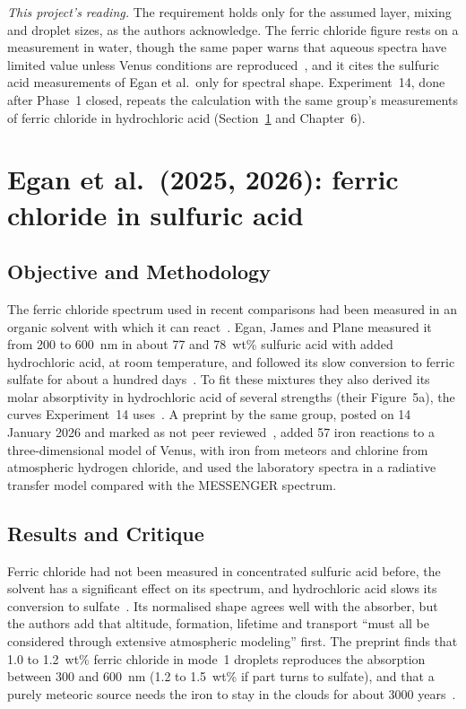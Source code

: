 \emph{This project's reading.} The requirement holds only for the assumed layer, mixing
and droplet sizes, as the authors acknowledge. The ferric chloride figure rests on a
measurement in water, though the same paper warns that aqueous spectra have limited value
unless Venus conditions are reproduced~\cite{spacek2026}, and it cites the sulfuric acid
measurements of Egan et al.\ only for spectral shape. Experiment~14, done after Phase~1
closed, repeats the calculation with the same group's measurements of ferric chloride in
hydrochloric acid (Section~\ref{sec:lit-egan} and Chapter~6).

\section{Egan et al.\ (2025, 2026): ferric chloride in sulfuric acid}
\label{sec:lit-egan}

\subsection{Objective and Methodology}

The ferric chloride spectrum used in recent comparisons had been measured in an organic
solvent with which it can react~\cite{egan2025lab}. Egan, James and Plane measured it
from 200 to 600~nm in about 77 and 78~wt\% sulfuric acid with added hydrochloric acid, at
room temperature, and followed its slow conversion to ferric sulfate for about a hundred
days~\cite{egan2025lab}. To fit these mixtures they also derived its molar absorptivity
in hydrochloric acid of several strengths (their Figure~5a), the curves Experiment~14
uses~\cite{egan2025lab}. A preprint by the same group, posted on 14 January 2026 and
marked as not peer reviewed~\cite{egan2026}, added 57 iron reactions to a
three-dimensional model of Venus, with iron from meteors and chlorine from atmospheric
hydrogen chloride, and used the laboratory spectra in a radiative transfer model compared
with the MESSENGER spectrum.

\subsection{Results and Critique}

Ferric chloride had not been measured in concentrated sulfuric acid before, the solvent
has a significant effect on its spectrum, and hydrochloric acid slows its conversion to
sulfate~\cite{egan2025lab}. Its normalised shape agrees well with the absorber, but the
authors add that altitude, formation, lifetime and transport ``must all be considered
through extensive atmospheric modeling'' first. The preprint finds that 1.0 to 1.2~wt\%
ferric chloride in mode~1 droplets reproduces the absorption between 300 and 600~nm (1.2
to 1.5~wt\% if part turns to sulfate), and that a purely meteoric source needs the iron to
stay in the clouds for about 3000 years~\cite{egan2026}.

